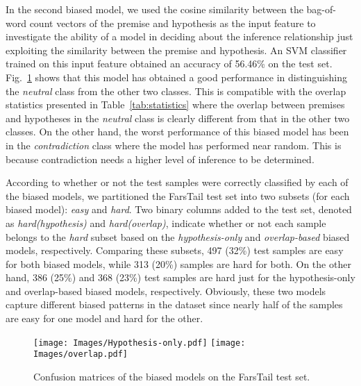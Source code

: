 \documentclass[preprint,12pt]{elsarticle}
\begin{document}
In the second biased model, we used the cosine similarity between the bag-of-word count vectors of the premise and hypothesis as the input feature to investigate the ability of a model in deciding about the inference relationship just exploiting the similarity between the premise and hypothesis. An SVM classifier trained on this input feature obtained an accuracy of 56.46\% on the test set. Fig.~\ref{fig:biased-confusion} shows that this model has obtained a good performance in distinguishing the \textit{neutral} class from the other two classes. This is compatible with the overlap statistics presented in Table~\ref{tab:statistics} where the overlap between premises and hypotheses in the \textit{neutral} class is clearly different from that in the other two classes. On the other hand, the worst performance of this biased model has been in the \textit{contradiction} class where the model has performed near random. This is because contradiction needs a higher level of inference to be determined.

According to whether or not the test samples were correctly classified by each of the biased models, we partitioned the FarsTail test set into two subsets (for each biased model): \textit{easy} and \textit{hard}. Two binary columns added to the test set, denoted as \textit{hard(hypothesis)} and \textit{hard(overlap)}, indicate whether or not each sample belongs to the \textit{hard} subset based on the \textit{hypothesis-only} and \textit{overlap-based} biased models, respectively. Comparing these subsets, 497 (32\%) test samples are easy for both biased models, while 313 (20\%) samples are hard for both. On the other hand, 386 (25\%) and 368 (23\%) test samples are hard just for the hypothesis-only and overlap-based biased models, respectively. Obviously, these two models capture different biased patterns in the dataset since nearly half of the samples are easy for one model and hard for the other. 

\begin{figure}
    \centering
    \texttt{[image: Images/Hypothesis-only.pdf]}
    \texttt{[image: Images/overlap.pdf]}
    \caption{Confusion matrices of the biased models on the FarsTail test set.}
    \label{fig:biased-confusion}
\end{figure}
\end{document}
